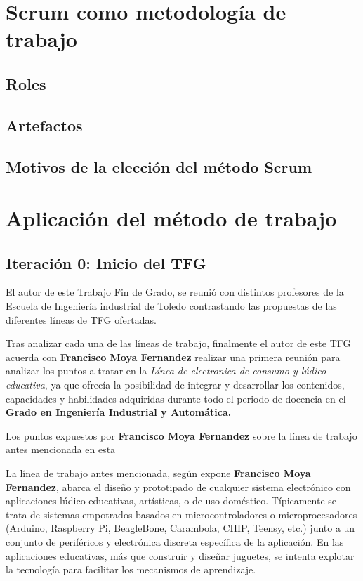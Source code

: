 \section{Scrum como metodología de trabajo}



\subsection{Roles}



\subsection{Artefactos}



\subsection{Motivos de la elección del método Scrum}



\section{Aplicación del método de trabajo}

\subsection{Iteración 0: Inicio del TFG}
El autor de este Trabajo Fin de Grado, se reunió con distintos profesores de la Escuela de Ingeniería industrial de Toledo contrastando las propuestas de las diferentes líneas de TFG ofertadas.

Tras analizar cada una de las líneas de trabajo, finalmente el autor de este TFG acuerda con \textbf{Francisco Moya Fernandez} realizar una primera reunión para analizar los puntos a tratar en la \textit{Línea de electronica de consumo y lúdico educativa}, ya que ofrecía la posibilidad de integrar y desarrollar los contenidos, capacidades y habilidades adquiridas durante todo el periodo de docencia en el \textbf{Grado en Ingeniería Industrial y Automática.}

Los puntos expuestos por \textbf{Francisco Moya Fernandez} sobre la línea de trabajo antes mencionada en esta 

La línea de trabajo antes mencionada, según expone \textbf{Francisco Moya Fernandez}, abarca el diseño y prototipado de cualquier sistema electrónico con aplicaciones lúdico-educativas, artísticas, o de uso doméstico. Típicamente se trata de sistemas empotrados basados en microcontroladores o microprocesadores (Arduino, Raspberry Pi, BeagleBone, Carambola, CHIP, Teensy, etc.) junto a un conjunto de periféricos y electrónica discreta específica de la aplicación. En las aplicaciones educativas, más que construir y diseñar juguetes, se intenta explotar la tecnología para facilitar los mecanismos de aprendizaje.

